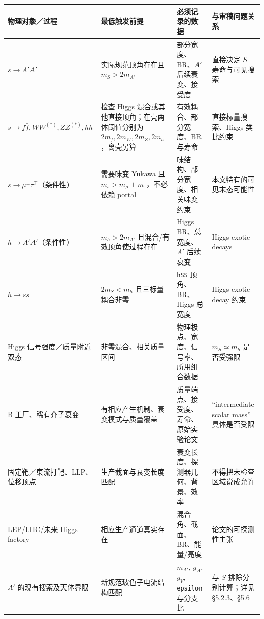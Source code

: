 \documentclass[
  chinese,
  UTF8]{ctexart}
\newcounter{none} %
\begin{document}
{\def\LTcaptype{none} %
\begin{longtable}[]{@{}
  >{\raggedright\arraybackslash}p{}
  >{\raggedright\arraybackslash}p{}
  >{\raggedright\arraybackslash}p{}
  >{\raggedright\arraybackslash}p{}@{}}
\toprule\noalign{}
\begin{minipage}[b]{\linewidth}\raggedright
物理对象／过程
\end{minipage} & \begin{minipage}[b]{\linewidth}\raggedright
最低触发前提
\end{minipage} & \begin{minipage}[b]{\linewidth}\raggedright
必须记录的数据
\end{minipage} & \begin{minipage}[b]{\linewidth}\raggedright
与审稿问题关系
\end{minipage} \\
\midrule\noalign{}
\endhead
\bottomrule\noalign{}
\endlastfoot
\(s\to A'A'\) & 实际规范顶角存在且 \(m_S>2m_{A'}\) &
部分宽度、BR、\(A'\) 后续衰变、接受度 & 直接决定 \(S\) 寿命与可见搜索 \\
\(s\to f\bar f,WW^{(*)},ZZ^{(*)},hh\) & 检查 Higgs
混合或其他直接顶角；在壳两体阈值分别为 \(2m_f,2m_W,2m_Z,2m_h\)，离壳另算
& 有效耦合、部分宽度、BR 与寿命 & 直接标量搜索、Higgs 类比约束 \\
\(s\to\mu^\pm\tau^\mp\)（条件性） & 需要味变 Yukawa 且
\(m_s>m_\mu+m_\tau\)，不必依赖 portal & 味结构、部分宽度、相关味变约束 &
本文特有的可见末态可能性 \\
\(h\to A'A'\)（条件性） & \(m_h>2m_{A'}\) 且混合/有效顶角使过程存在 &
Higgs BR、总宽度、\(A'\) 后续衰变 & Higgs exotic decays \\
\(h\to ss\) & \(2m_S<m_h\) 且三标量耦合非零 & \texttt{hSS}
顶角、BR、Higgs 总宽度 & Higgs exotic-decay 约束 \\
Higgs 信号强度／质量附近双态 & 非零混合、相关质量区间 &
物理极点、宽度、信号率、所用组合数据 & \(m_S\simeq m_h\) 是否受强限 \\
B 工厂、稀有介子衰变 & 有相应产生机制、衰变模式与质量覆盖 &
质量端点、接受度、寿命、原始实验论文 & ``intermediate scalar mass''
具体是否受限 \\
固定靶／束流打靶、LLP、位移顶点 & 生产截面与衰变长度匹配 &
衰变长度、探测器几何、背景、效率 & 不得把未检查区域说成允许 \\
LEP/LHC/未来 Higgs factory & 相应生产通道真实存在 &
混合角、截面、BR、能量/亮度 & 论文的可探测性主张 \\
\(A'\) 的现有搜索及天体界限 & 新规范玻色子电流结构匹配 & \(m_{A'}\),
\(g_A\), \(g_V\), \texttt{epsilon} 与分支比 & 与 \(S\)
排除分别计算；详见 §5.2.3、§5.6 \\
\end{longtable}
}
\end{document}
